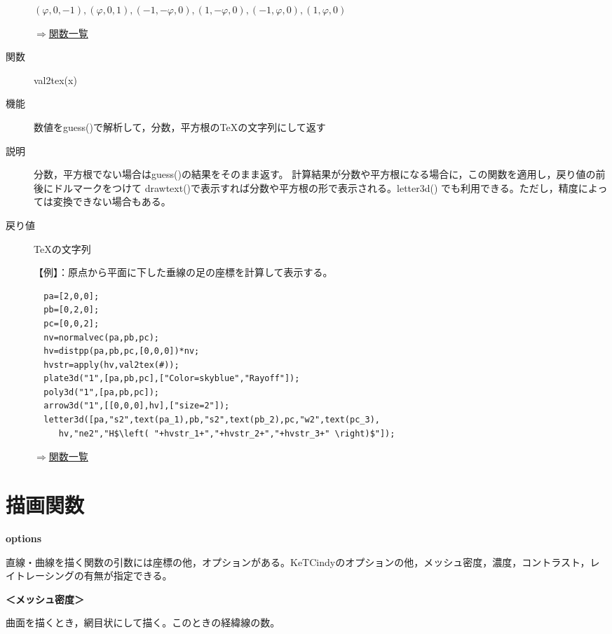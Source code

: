 \documentclass[papersize,a4paper,12pt,uplatex]{jsarticle}
\begin{document}
\begin{description}
\hspace{15mm}    $  (φ,0,-1),(φ,0,1),(-1,-φ,0),(1,-φ,0),(-1,φ,0),(1,φ,0)$  

\begin{flushright} \hyperlink{functionlist}{$\Rightarrow$関数一覧}\end{flushright}

\hypertarget{val2tex}{}\item[関数] val2tex(x)
\item[機能] 数値をguess()で解析して，分数，平方根のTeXの文字列にして返す
\item[説明] 分数，平方根でない場合はguess()の結果をそのまま返す。 
 計算結果が分数や平方根になる場合に，この関数を適用し，戻り値の前後にドルマークをつけて drawtext()で表示すれば分数や平方根の形で表示される。letter3d() でも利用できる。ただし，精度によっては変換できない場合もある。
 
\item[戻り値] TeXの文字列

【例】：原点から平面に下した垂線の足の座標を計算して表示する。 
\begin{verbatim}
  pa=[2,0,0];
  pb=[0,2,0];
  pc=[0,0,2];
  nv=normalvec(pa,pb,pc);
  hv=distpp(pa,pb,pc,[0,0,0])*nv;
  hvstr=apply(hv,val2tex(#));
  plate3d("1",[pa,pb,pc],["Color=skyblue","Rayoff"]);
  poly3d("1",[pa,pb,pc]);
  arrow3d("1",[[0,0,0],hv],["size=2"]);
  letter3d([pa,"s2",text(pa_1),pb,"s2",text(pb_2),pc,"w2",text(pc_3),
     hv,"ne2","H$\left( "+hvstr_1+","+hvstr_2+","+hvstr_3+" \right)$"]);
\end{verbatim}

\begin{flushright} \hyperlink{functionlist}{$\Rightarrow$関数一覧}\end{flushright}

\end{description}
\newpage
\section{描画関数}

\textbf{options}
 
直線・曲線を描く関数の引数には座標の他，オプションがある。KeTCindyのオプションの他，メッシュ密度，濃度，コントラスト，レイトレーシングの有無が指定できる。

\textbf{＜メッシュ密度＞} 

曲面を描くとき，網目状にして描く。このときの経緯線の数。
\end{document}
